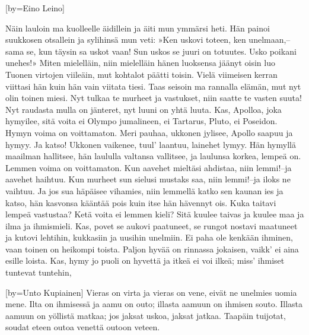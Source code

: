 \endsong




[by=Eino Leino]

\beginverse
Näin lauloin ma kuolleelle äidillein
ja äiti mun ymmärsi heti.
Hän painoi suukkosen otsallein
ja sylihinsä mun veti:
»Ken uskovi toteen, ken unelmaan,--
sama se, kun täysin sa uskot vaan!
Sun uskos se juuri on totuutes.
Usko poikani unehes!»
\endverse
\beginverse
Miten mielelläin, niin mielelläin
hänen luoksensa jäänyt oisin
luo Tuonen virtojen viileäin,
mut kohtalot päätti toisin.
Vielä viimeisen kerran viittasi hän
kuin hän vain viitata tiesi.
Taas seisoin ma rannalla elämän,
mut nyt olin toinen miesi.
\endverse
\beginverse
Nyt tulkaa te murheet ja vastukset,
niin saatte te vasten suuta!
Nyt raudasta mulla on jänteret,
nyt luuni on yhtä luuta.
Kas, Apolloa, joka hymyilee,
sitä voita ei Olympo jumalineen,
ei Tartarus, Pluto, ei Poseidon.
Hymyn voima on voittamaton.
\endverse
\beginverse
Meri pauhaa, ukkonen jylisee,
Apollo saapuu ja hymyy.
Ja katso! Ukkonen vaikenee,
tuul' laantuu, lainehet lymyy.
Hän hymyllä maailman hallitsee,
hän laululla valtansa vallitsee,
ja laulunsa korkea, lempeä on.
Lemmen voima on voittamaton.
\endverse
\beginverse
Kun aavehet mieltäsi ahdistaa,
niin lemmi!--ja aavehet haihtuu.
Kun murheet sun sielusi mustaks saa,
niin lemmi!--ja iloks ne vaihtuu.
Ja jos sua häpäisee vihamies,
niin lemmellä katko sen kaunan ies
ja katso, hän kasvonsa kääntää pois
kuin itse hän hävennyt ois.
\endverse
\beginverse
Kuka taitavi lempeä vastustaa?
Ketä voita ei lemmen kieli?
Sitä kuulee taivas ja kuulee maa
ja ilma ja ihmismieli.
Kas, povet se aukovi paatuneet,
se rungot nostavi maatuneet
ja kutovi lehtihin, kukkasiin
ja uusihin unelmiin.
\endverse
\beginverse
Ei paha ole kenkään ihminen,
vaan toinen on heikompi toista.
Paljon hyvää on rinnassa jokaisen,
vaikk' ei aina esille loista.
Kas, hymy jo puoli on hyvettä
ja itkeä ei voi ilkeä;
miss' ihmiset tuntevat tuntehin,
\endverse

\endsong


[by={Unto Kupiainen}]
\beginverse
Vieras on virta ja vieras on vene, 
eivät ne unelmies uomia mene. 
Ilta on ihmisessä ja aamu on outo; 
illasta aamuun on ihmisen souto. 
Illasta aamuun on yöllistä matkaa; 
jos jaksat uskoa, jaksat jatkaa. 
Taapäin tuijotat, soudat eteen 
outoa venettä outoon veteen. 
\endverse
\endsong